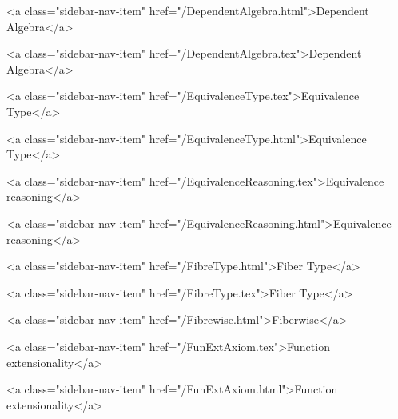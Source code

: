       
    
      
        
          <a class="sidebar-nav-item" href="/DependentAlgebra.html">Dependent Algebra</a>
        
      
    
      
        
          <a class="sidebar-nav-item" href="/DependentAlgebra.tex">Dependent Algebra</a>
        
      
    
      
        
          <a class="sidebar-nav-item" href="/EquivalenceType.tex">Equivalence Type</a>
        
      
    
      
        
          <a class="sidebar-nav-item" href="/EquivalenceType.html">Equivalence Type</a>
        
      
    
      
        
          <a class="sidebar-nav-item" href="/EquivalenceReasoning.tex">Equivalence reasoning</a>
        
      
    
      
        
          <a class="sidebar-nav-item" href="/EquivalenceReasoning.html">Equivalence reasoning</a>
        
      
    
      
        
          <a class="sidebar-nav-item" href="/FibreType.html">Fiber Type</a>
        
      
    
      
        
          <a class="sidebar-nav-item" href="/FibreType.tex">Fiber Type</a>
        
      
    
      
        
          <a class="sidebar-nav-item" href="/Fibrewise.html">Fiberwise</a>
        
      
    
      
        
          <a class="sidebar-nav-item" href="/FunExtAxiom.tex">Function extensionality</a>
        
      
    
      
        
          <a class="sidebar-nav-item" href="/FunExtAxiom.html">Function extensionality</a>
        
